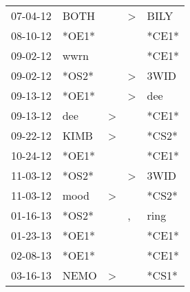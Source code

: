 \begin{supertabular}{p{0.07\textwidth}p{0.06\textwidth}p{0.02\textwidth}p{0.02\textwidth}p{0.06\textwidth}}
          07-04-12\textsuperscript{} &           BOTH\textsuperscript{} &                  &     \textgreater &           BILY\textsuperscript{} \\
          08-10-12\textsuperscript{} &                            *OE1* &                  &                  &                            *CE1* \\
          09-02-12\textsuperscript{} &           wwrn\textsuperscript{} &                  &                  &                            *CE1* \\
          09-02-12\textsuperscript{} &                            *OS2* &                  &     \textgreater &           3WID\textsuperscript{} \\
          09-13-12\textsuperscript{} &                            *OE1* &                  &     \textgreater &            dee\textsuperscript{} \\
          09-13-12\textsuperscript{} &            dee\textsuperscript{} &     \textgreater &                  &                            *CE1* \\
          09-22-12\textsuperscript{} &           KIMB\textsuperscript{} &     \textgreater &                  &                            *CS2* \\
          10-24-12\textsuperscript{} &                            *OE1* &                  &                  &                            *CE1* \\
          11-03-12\textsuperscript{} &                            *OS2* &                  &     \textgreater &           3WID\textsuperscript{} \\
          11-03-12\textsuperscript{} &           mood\textsuperscript{} &     \textgreater &                  &                            *CS2* \\
          01-16-13\textsuperscript{} &                            *OS2* &                  &                , &           ring\textsuperscript{} \\
          01-23-13\textsuperscript{} &                            *OE1* &                  &                  &                            *CE1* \\
          02-08-13\textsuperscript{} &                            *OE1* &                  &                  &                            *CE1* \\
          03-16-13\textsuperscript{} &           NEMO\textsuperscript{} &     \textgreater &                  &                            *CS1* \\

\end{supertabular}
